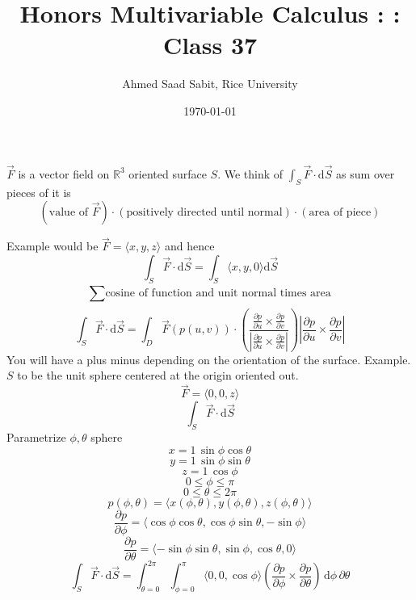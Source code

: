 \documentclass[letter]{article}
\title{Honors Multivariable Calculus : : Class 37}
\author{Ahmed Saad Sabit, Rice University}
\date{\today}
\begin{document}
\maketitle
$\vec{F}$ is a vector field on $\mathbb{R}^{3}$ oriented surface $S$. We think of $\int_S \vec{F} \cdot \mathrm{d} \vec{S}$ as sum over pieces of it is 
 \[
	 (\text{value of } \vec{F}) \cdot (\text{positively directed until normal}) \cdot (\text{area of piece})
\]

Example would be $\vec{F} = \langle  x,y,z \rangle$ and hence
\[
\int_S \vec{F} \cdot \mathrm{d}  \vec{S} = \int_S \langle x, y ,0 \rangle \mathrm{d} \vec{S} 
\]
\[\sum_{}^{} 
\text{cosine of function and unit normal times area}
\]
\[
\int_S \vec{F} \cdot \mathrm{d} \vec{S} = 
\int_D \vec{F}(p(u,v)) \cdot  
\left(
\frac{
\frac{\partial p}{\partial u} \times \frac{\partial p}{\partial v}
}{ 
\left| 
\frac{\partial p}{\partial u} \times \frac{\partial p}{\partial v}
\right|}
\right) 
\left|
\frac{\partial p}{\partial u} \times \frac{\partial p}{\partial v}
\right| 
\]
You will have a plus minus depending on the orientation of the surface. 
Example. $S$ to be the unit sphere centered at the origin oriented out. 
\[
\vec{F} = \langle 0,0,z \rangle 
\]
\[
\int_S \vec{F} \cdot \mathrm{d} \vec{S}
\]
Parametrize $\phi, \theta$ sphere 
\[
x = 1 \, \sin \phi \cos \theta
\] 
\[
y = 1 \, \sin \phi \sin \theta
\] 
\[
z = 1 \, \cos \phi
\] 
\[
0 \le \phi \le \pi 
\] 
\[
0 \le \theta \le  2 \pi 
\] 
\[
p(\phi, \theta) = \langle x(\phi,\theta), y(\phi,\theta), z(\phi,\theta) \rangle
\] 
\[
\frac{\partial p}{\partial \phi} = 
\langle \cos \phi \cos \theta, \cos \phi \sin \theta, - \sin \phi \rangle 
\] 
\[
\frac{\partial p}{\partial \theta} = 
\langle - \sin \phi \sin \theta, \sin \phi , \cos \theta, 0 \rangle 
\] 
\[
\int_S \vec{F} \cdot \mathrm{d} \vec{S} = 
\int_{\theta = 0}^{2 \pi } \int_{\phi = 0}^{\pi } \langle 0, 0, \cos \phi \rangle 
\left( \frac{\partial p}{\partial \phi}  \times \frac{\partial p}{\partial \theta}\right) 
\, 
\mathrm{d} \phi \, \partial \theta
\] 
\end{document}
